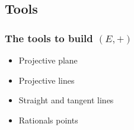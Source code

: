 \subsection{Tools}

\begin{frame}[t]
    \frametitle{The tools to build $\left( E,+ \right) $}
    \begin{itemize}
        \item Projective plane


        \item Projective lines


        \item Straight and tangent lines


        \item Rationals points

    \end{itemize}
\end{frame}
